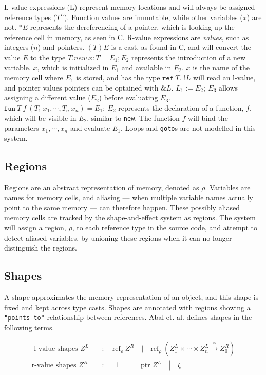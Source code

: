 \noindent L-value expressions (L) represent memory locations and will always be assigned reference types ($T^L$). Function values are immutable, while other variables ($x$) are not. $*E$ represents the dereferencing of a pointer, which is looking up the reference cell in memory, as seen in C. R-value expressions are \textit{values}, such as integers ($n$) and pointers. $(T)E$ is a cast, as found in C, and will convert the value $E$ to the type $T$.$new\: x : T = E_1; E_2$ represents the introduction of a new variable, $x$, which is initialized in $E_1$ and available in $E_2$. $x$ is the name of the memory cell where $E_1$ is stored, and has the type $\texttt{ref} \:T$. $!L$ will read an l-value, and pointer values pointers can be optained with $\&L$.
$L_1 := E_2 ;\: E_3$ allows assigning a different value ($E_2$) before evaluating $E_3$. $\texttt{fun} \:T\:f\:(T_1\:x_1, \cdots, T_n\:x_n) = E_1 ;\: E_2$ represents the declaration of a function, $f$, which will be visible in $E_2$, similar to \texttt{new}. The function $f$ will bind the parameters $x_1, \cdots, x_n$ and evaluate $E_1$. Loops and \texttt{goto}s are not modelled in this system. 

\subsection{Regions}
Regions are an abstract representation of memory, denoted as $\rho$. Variables are names for memory cells, and aliasing --- when multiple variable names actually point to the same memory --- can therefore happen. These possibly aliased memory cells are tracked by the shape-and-effect system as regions. The system will assign a region, $\rho$, to each reference type in the source code, and attempt to detect aliased variables, by unioning these regions when it can no longer distinguish the regions.

\subsection{Shapes}
A shape approximates the memory representation of an object, and this shape is fixed and kept across type casts. Shapes are annotated with regions showing a \texttt{"points-to"} relationship between references. Abal et. al. defines shapes in the following terms. 

\begin{equation*}
\begin{aligned}
    \text { l-value shapes } Z^L \quad &: \quad \text{ref}_{\rho} \:Z^R \quad | \quad \text{ref}_{\rho}\:(Z_1^L \times \cdots \times Z_n^L \stackrel{\varphi}{\rightarrow} Z_0^R)\\
    \text {r-value shapes } Z^R \quad &: \quad \perp \quad | \quad \text { ptr } Z^L \quad | \quad \zeta
\end{aligned}
\end{equation*}

